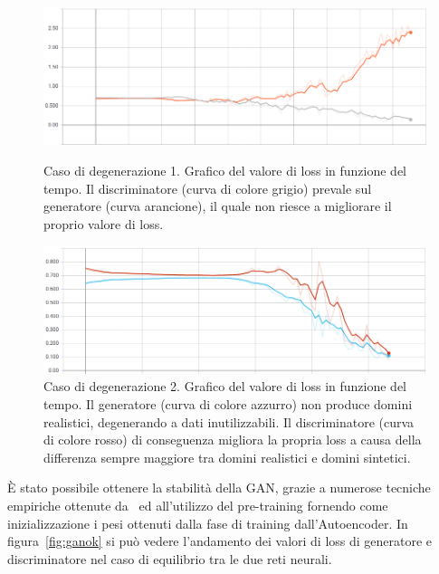 \begin{figure}[!bp]
    \centering
    \includegraphics[width=\columnwidth]{figures/gan/ganfailure1.png}
    \caption{Caso di degenerazione 1. Grafico del valore di loss in funzione del tempo. Il discriminatore (curva di colore grigio) prevale sul generatore (curva arancione), il quale non riesce a migliorare il proprio valore di loss.\label{fig:ganfailure1}}
	\vspace{3cm}
    \centering
    \includegraphics[width=\columnwidth]{figures/gan/ganfailure2.png}
    \caption{Caso di degenerazione 2. Grafico del valore di loss in funzione del tempo. Il generatore (curva di colore azzurro) non produce domini realistici, degenerando a dati inutilizzabili. Il discriminatore (curva di colore rosso) di conseguenza migliora la propria loss a causa della differenza sempre maggiore tra domini realistici e domini sintetici. \label{fig:ganfailure2}}
\end{figure}

\`E stato possibile ottenere la stabilità della GAN, grazie a numerose tecniche empiriche ottenute da~\cite{1606.03498} ed all'utilizzo del pre-training fornendo come inizializzazione i pesi ottenuti dalla fase di training dall'Autoencoder. In figura~\ref{fig:ganok} si può vedere l'andamento dei valori di loss di generatore e discriminatore nel caso di equilibrio tra le due reti neurali.

